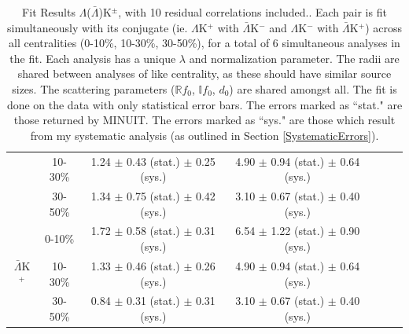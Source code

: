 \documentclass[../AnalysisNoteJBuxton.tex]{subfiles}
\begin{document}
\begin{landscape}
\begin{table}[htbp]
{\begin{tabular}{|c|c|c|c|c|c|c|}
   & 10-30\% & 1.24 $\pm$ 0.43 (stat.) $\pm$ 0.25 (sys.)  %
             & 4.90 $\pm$ 0.94 (stat.) $\pm$ 0.64 (sys.)  %
             & & & \\
             
   & 30-50\% & 1.34 $\pm$ 0.75 (stat.) $\pm$ 0.42 (sys.)  %
             & 3.10 $\pm$ 0.67 (stat.) $\pm$ 0.40 (sys.)  %
             & & & \\
  \cline{1-4}  
  \multirow{3}{*}{$\bar{\Lambda}$K$^{+}$}  
   &  0-10\% & 1.72 $\pm$ 0.58 (stat.) $\pm$ 0.31 (sys.)  %
             & 6.54 $\pm$ 1.22 (stat.) $\pm$ 0.90 (sys.)  %
             & & & \\
             
   & 10-30\% & 1.33 $\pm$ 0.46 (stat.) $\pm$ 0.26 (sys.)  %
             & 4.90 $\pm$ 0.94 (stat.) $\pm$ 0.64 (sys.)  %
             & & & \\
             
   & 30-50\% & 0.84 $\pm$ 0.31 (stat.) $\pm$ 0.31 (sys.)  %
             & 3.10 $\pm$ 0.67 (stat.) $\pm$ 0.40 (sys.)  %
             & & & \\
  \hline
 \end{tabular}}
 \caption{Fit Results $\Lambda$($\bar{\Lambda}$)K$^{\pm}$, with 10 residual correlations included..
 Each pair is fit simultaneously with its conjugate (ie. $\Lambda$K$^{+}$ with $\bar{\Lambda}$K$^{-}$ and $\Lambda$K$^{-}$ with $\bar{\Lambda}$K$^{+}$) across all centralities (0-10\%, 10-30\%, 30-50\%), for a total of 6 simultaneous analyses in the fit.
 Each analysis has a unique $\lambda$ and normalization parameter.
 The radii are shared between analyses of like centrality, as these should have similar source sizes.
 The scattering parameters ($\mathbb{R}f_{0}$, $\mathbb{I}f_{0}$, $d_{0}$) are shared amongst all.
 The fit is done on the data with only statistical error bars.
 The errors marked as ``stat." are those returned by MINUIT.
 The errors marked as ``sys." are those which result from my systematic analysis (as outlined in Section \ref{SystematicErrors}).}
 \label{tab:FitResultsLamKch_10Res}
\end{table}

\end{landscape}
\pagestyle{plain}
\end{document}
